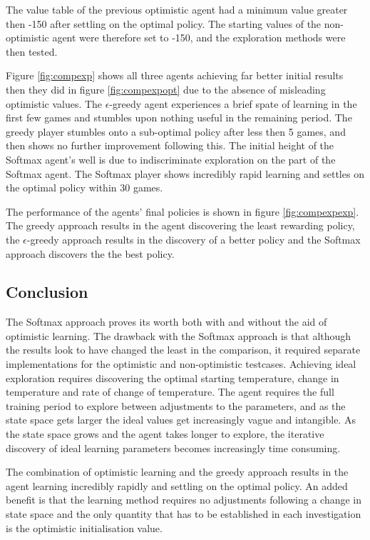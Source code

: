 \documentclass{rucsthesis}
\begin{document}
The value table of the previous optimistic agent had a minimum value greater then -150 after settling on the optimal policy. The starting values of the non-optimistic agent were therefore set to -150, and the exploration methods were then tested.

Figure \ref{fig:compexp} shows all three agents achieving far better initial results then they did in figure \ref{fig:compexpopt} due to the absence of misleading optimistic values. The $\epsilon$-greedy agent experiences a brief spate of learning in the first few games and stumbles upon nothing useful in the remaining period. The greedy player stumbles onto a sub-optimal policy after less then 5 games, and then shows no further improvement following this. The initial height of the Softmax agent's well is due to indiscriminate exploration on the part of the Softmax agent. The Softmax player shows incredibly rapid learning and settles on the optimal policy within 30 games.

The performance of the agents' final policies is shown in figure \ref{fig:compexpexp}. The greedy approach results in the agent discovering the least rewarding policy,  the $\epsilon$-greedy approach results in the discovery of a better policy and the Softmax approach discovers the the best policy.

\subsection{Conclusion}

The Softmax approach proves its worth both with and without the aid of optimistic learning. The drawback with the Softmax approach is that although the results look to have changed the least in the comparison, it required separate implementations for the optimistic and non-optimistic testcases. Achieving ideal exploration requires discovering the optimal starting temperature, change in temperature and rate of change of temperature. The agent requires the full training period to explore between adjustments to the parameters, and as the state space gets larger the ideal values get increasingly vague and intangible. As the state space grows and the agent takes longer to explore, the iterative discovery of ideal learning parameters becomes increasingly time consuming.

The combination of optimistic learning and the greedy approach results in the agent learning incredibly rapidly and settling on the optimal policy. An added benefit is that the learning method requires no adjustments following a change in state space and the only quantity that has to be established in each investigation is the optimistic initialisation value.
\end{document}
